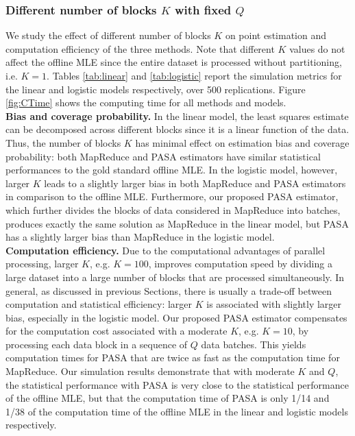 \documentclass[12pt]{article}
\begin{document}
\subsubsection{Different number of blocks $K$ with fixed $Q$}
\label{subsubsec:simulations:evaluation:S1}
We study the effect of different number of blocks $K$ on point estimation and computation efficiency of the three methods. Note that different $K$ values do not affect the offline MLE since the entire dataset is processed without partitioning, i.e. $K=1$. Tables \ref{tab:linear} and \ref{tab:logistic} report the simulation metrics for the linear and logistic models respectively, over 500 replications. Figure \ref{fig:CTime} shows the computing time for all methods and models.\\
{\bf Bias and coverage probability.} In the linear model, the least squares estimate can be decomposed across different blocks since it is a linear function of the data. Thus, the number of blocks $K$ has minimal effect on estimation bias and coverage probability: both MapReduce and PASA estimators have similar statistical performances to the gold standard offline MLE. In the logistic model, however, larger $K$ leads to a slightly larger bias in both MapReduce and PASA estimators in comparison to the offline MLE. Furthermore, our proposed PASA estimator, which further divides the blocks of data considered in MapReduce into batches, produces exactly the same solution as MapReduce in the linear model, but PASA has a slightly larger bias than MapReduce in the logistic model.\\
{\bf Computation efficiency.} Due to the computational advantages of parallel processing, larger $K$, e.g. $K=100$, improves computation speed by dividing a large dataset into a large number of blocks that are processed simultaneously. In general, as discussed in previous Sections, there is usually a trade-off between computation and statistical efficiency: larger $K$ is associated with slightly larger bias, especially in the logistic model. Our proposed PASA estimator compensates for the computation cost associated with a moderate $K$, e.g. $K=10$, by processing each data block in a sequence of $Q$ data batches. This yields computation times for PASA that are twice as fast as the computation time for MapReduce. Our simulation results demonstrate that with moderate $K$ and $Q$, the statistical performance with PASA is very close to the statistical performance of the offline MLE, but that the computation time of PASA is only 1/14 and 1/38 of the computation time of the offline MLE in the linear and logistic models respectively.\\
\end{document}
